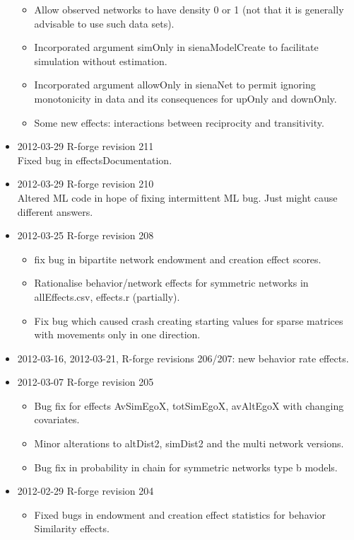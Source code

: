 \documentclass[a4paper,fleqn,11pt]{article}
\newcommand{\+}{\, + \,}
\begin{document}
\begin{small}
\begin{itemize}
\begin{itemize}
     \item Allow observed networks to have density 0 or 1
     (not that it is generally advisable to use such data sets).
     \item Incorporated argument simOnly in sienaModelCreate to facilitate
	  simulation without estimation.
     \item Incorporated argument allowOnly in sienaNet to permit
	  ignoring monotonicity in data and its consequences for upOnly and downOnly.
     \item Some new effects: interactions between reciprocity and
       transitivity.
    \end{itemize}
\item 2012-03-29 R-forge revision 211\\
Fixed bug in effectsDocumentation.
\item 2012-03-29 R-forge revision 210\\
Altered ML code in hope of fixing intermittent ML bug. Just might cause
different answers.
\item 2012-03-25 R-forge revision 208
\begin{itemize}
\item fix bug in bipartite network endowment
  and creation effect scores.
\item Rationalise behavior/network effects for symmetric
  networks in allEffects.csv, effects.r (partially).
\item Fix bug which caused crash creating starting values for sparse matrices
  with movements only in one direction.
\end{itemize}
\item 2012-03-16, 2012-03-21, R-forge revisions 206/207: new behavior rate
  effects.
\item 2012-03-07 R-forge revision 205
\begin{itemize}
\item Bug fix for effects AvSimEgoX, totSimEgoX, avAltEgoX with changing
  covariates.
\item Minor alterations to altDist2, simDist2 and the multi network
  versions.
\item Bug fix in probability in chain for symmetric networks type b models.
\end{itemize}
\item 2012-02-29 R-forge revision 204
\begin{itemize}
\item Fixed bugs in endowment and creation effect statistics for behavior
  Similarity effects.

\end{itemize}
\end{itemize}
\end{small}
\end{document}
